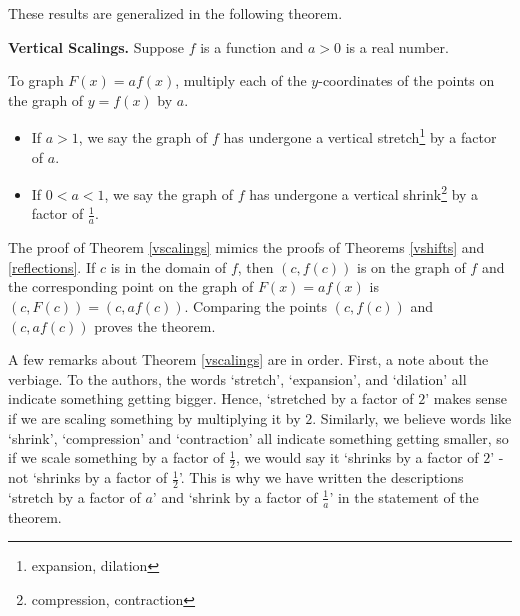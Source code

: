 \documentclass{ximera}
\begin{document}
These results are generalized in the following theorem.

\smallskip

\colorbox{ResultColor}{\bbm


\begin{theorem} \label{vscalings}\textbf{Vertical Scalings.} Suppose $f$ is a function and $a>0$ is a real number. 

To graph $F(x) = af(x)$, multiply each of the $y$-coordinates of the points on the graph of $y=f(x)$ by $a$. 

\begin{itemize}

\item If $a > 1$, we say the graph of $f$ has undergone a vertical stretch\footnote{expansion, dilation} by a factor of $a$. 

\item If $0 < a < 1$, we say the graph of $f$ has undergone a vertical shrink\footnote{ compression, contraction} by a factor of $\frac{1}{a}$.

\end{itemize}

\end{theorem}

\ebm}

\smallskip

The proof of Theorem \ref{vscalings} mimics the proofs of Theorems \ref{vshifts} and \ref{reflections}.  If $c$ is in the domain of $f$, then $(c, f(c))$ is on the graph of $f$ and the corresponding point on the graph of $F(x)=af(x)$ is $(c, F(c)) = (c, a f(c))$.  Comparing the points $(c, f(c))$ and $(c, a f(c))$ proves the theorem.  

\smallskip

A few remarks about Theorem \ref{vscalings} are in order.  First, a note about the verbiage.  To the authors, the words `stretch', `expansion', and `dilation' all indicate something getting bigger.  Hence, `stretched by a factor of $2$' makes sense if we are scaling something by multiplying it by $2$. Similarly, we believe words like `shrink', `compression' and `contraction' all indicate something getting smaller, so if we scale something by a factor of $\frac{1}{2}$, we would say it `shrinks by a factor of $2$' - not `shrinks by a factor of $\frac{1}{2}$'.  This is why we have written the descriptions `stretch by a factor of $a$' and `shrink by a factor of $\frac{1}{a}$' in the statement of the theorem.  
\end{document}
